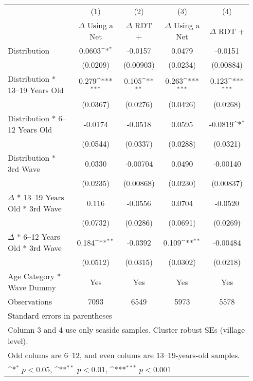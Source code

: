 {
\def\sym#1{\ifmmode^{#1}\else\(^{#1}\)\fi}
\begin{tabular}{l*{4}{c}}
\hline\hline
                    &\multicolumn{1}{c}{(1)}&\multicolumn{1}{c}{(2)}&\multicolumn{1}{c}{(3)}&\multicolumn{1}{c}{(4)}\\
                    &\multicolumn{1}{c}{$\Delta$ Using a Net}&\multicolumn{1}{c}{$\Delta$ RDT +}&\multicolumn{1}{c}{$\Delta$ Using a Net}&\multicolumn{1}{c}{$\Delta$ RDT +}\\
\hline
Distribution        &      0.0603\sym{*}  &     -0.0157         &      0.0479         &     -0.0151         \\
                    &    (0.0209)         &   (0.00903)         &    (0.0234)         &   (0.00884)         \\
[1em]
Distribution * 13--19 Years Old&       0.279\sym{***}&       0.105\sym{**} &       0.263\sym{***}&       0.123\sym{***}\\
                    &    (0.0367)         &    (0.0276)         &    (0.0426)         &    (0.0268)         \\
[1em]
Distribution * 6--12 Years Old&     -0.0174         &     -0.0518         &      0.0595         &     -0.0819\sym{*}  \\
                    &    (0.0544)         &    (0.0337)         &    (0.0288)         &    (0.0321)         \\
[1em]
Distribution * 3rd Wave&      0.0330         &    -0.00704         &      0.0490         &    -0.00140         \\
                    &    (0.0235)         &   (0.00868)         &    (0.0230)         &   (0.00837)         \\
[1em]
$\Delta$  * 13--19 Years Old * 3rd Wave&       0.116         &     -0.0556         &      0.0704         &     -0.0520         \\
                    &    (0.0732)         &    (0.0286)         &    (0.0691)         &    (0.0269)         \\
[1em]
$\Delta$  * 6--12 Years Old * 3rd Wave&       0.184\sym{**} &     -0.0392         &       0.109\sym{**} &    -0.00484         \\
                    &    (0.0512)         &    (0.0315)         &    (0.0302)         &    (0.0218)         \\
[1em]
Age Category * Wave Dummy&         Yes         &         Yes         &         Yes         &         Yes         \\
\hline
Observations        &        7093         &        6549         &        5973         &        5578         \\
\hline\hline
\multicolumn{5}{l}{\footnotesize Standard errors in parentheses}\\
\multicolumn{5}{l}{\footnotesize Column 3 and 4 use only seaside samples. Cluster robust SEs (village level).}\\
\multicolumn{5}{l}{\footnotesize Odd colums are 6--12, and even colums are 13--19-years-old samples.}\\
\multicolumn{5}{l}{\footnotesize \sym{*} \(p<0.05\), \sym{**} \(p<0.01\), \sym{***} \(p<0.001\)}\\
\end{tabular}
}

